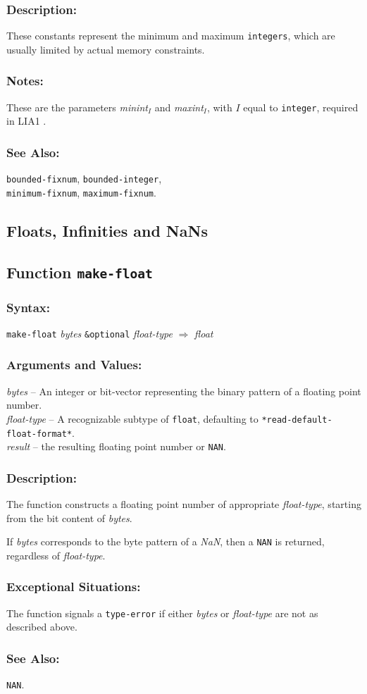 \documentclass[10pt,fleqn]{article}
\newcommand{\code}[1]{\texttt{#1}}
\newcommand{\varname}[1]{\textit{#1}}
\newcommand{\DDictionaryItem}[1]{\vspace*{6pt}\noindent\hrulefill\vspace*{-9pt}\subsection*{#1}}
\newcommand{\DSyntax}{\subsubsection*{Syntax:}}
\newcommand{\DArgsNValues}{\subsubsection*{Arguments and Values:}}
\newcommand{\DDescription}{\subsubsection*{Description:}}
\newcommand{\DExceptional}{\subsubsection*{Exceptional Situations:}}
\newcommand{\DNotes}{\subsubsection*{Notes:}}
\newcommand{\DSeeAlso}{\subsubsection*{See Also:}}
\begin{document}
\DDescription{}

These constants represent the minimum and maximum \code{integers},
which are usually limited by actual memory constraints.

\DNotes{}

These are the parameters \textit{minint}$_I$ and \textit{maxint}$_I$,
with $I$ equal to \code{integer}, required in LIA1 \cite{2012:LIA1}.

\DSeeAlso{}

\code{bounded-fixnum},
\code{bounded-integer},\\
%
\code{minimum-fixnum},
\code{maximum-fixnum}.

\newpage

\subsection{Floats, Infinities and NaNs}


\DDictionaryItem{Function \code{make-float}}
\index{M!\code{make-float}}

\DSyntax{}

\code{make-float} \varname{bytes} \code{\&optional}
\varname{float-type}
$\Rightarrow$ \varname{float}

\DArgsNValues{}

\varname{bytes} -- An integer or bit-vector representing the binary
pattern of a floating point number.\\
\varname{float-type} -- A recognizable subtype of \code{float},
defaulting to \code{*read-default-float-format*}.\\
\varname{result} -- the resulting floating point number or \code{NAN}.


\DDescription{}

The function constructs a floating point number of appropriate
\varname{float-type}, starting from the bit content of
\varname{bytes}.

If \varname{bytes} corresponds to the byte pattern of a \emph{NaN},
then a \code{NAN} is returned, regardless of \varname{float-type}.

\DExceptional{}

The function signals a \code{type-error} if either \varname{bytes} or
\varname{float-type} are not as described above.

\DSeeAlso{}

\code{NAN}.
\end{document}
